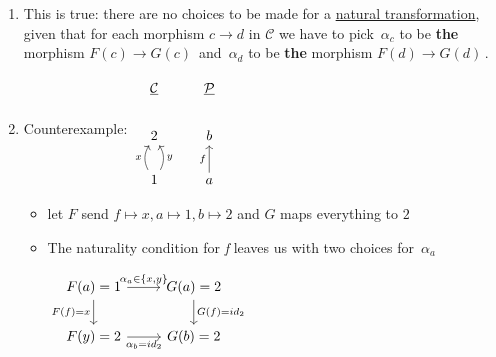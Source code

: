 \begin{enumerate}
    \item   This is true: there are no choices to be made for a \hyperref[D3.49]{natural transformation}, given that for each morphism $c\rightarrow d$ in $\mathcal{C}$ we have to pick \,$\alpha_c$ to be \textbf{the} morphism $F(c)\rightarrow G(c)$\, and \,$\alpha_{d}$ to be \textbf{the} morphism $F(d)\rightarrow G(d)$\,.
    \item Counterexample: $\begin{tikzcd}\underline{\mathcal{C}}&\underline{\mathcal{P}}\\2&b\\1 \arrow[u, "x", bend left] \arrow[u, "y"', bend right] &a \arrow[u, "f"]\end{tikzcd}$
          \begin{itemize}
            \item let $F$ send $f\mapsto x,a\mapsto1,b\mapsto 2$ and $G$ maps everything to $2$
            \item The naturality condition for \emph{f} leaves us with two choices for \,$\alpha_a$

                  $\begin{tikzcd}F(a)=1 \arrow[d, "F(f)=x"'] \arrow[r, "{\alpha_a \in \{x,y\}}"] & G(a)=2 \arrow[d, "G(f)=id_2"] \\F(y)=2 \arrow[r, "{\alpha_b=id_2}"'] & G(b)=2 \end{tikzcd}$\,
          \end{itemize}

  \end{enumerate}
